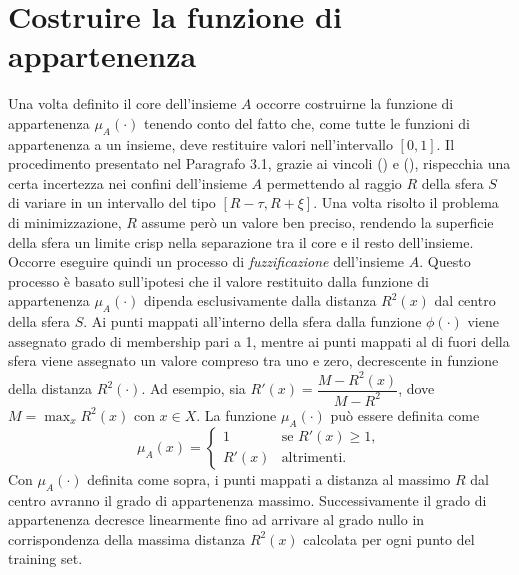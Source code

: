 \documentclass [11pt,a4paper,twoside,openright] {book}
\begin{document}
\section{Costruire la funzione di appartenenza}
Una volta definito il core dell'insieme $A$ occorre costruirne la funzione di appartenenza $\mu_A(\cdot)$ tenendo conto del fatto che, come tutte le funzioni di appartenenza a un insieme, deve restituire valori nell'intervallo $[0, 1]$. Il procedimento presentato nel Paragrafo 3.1, grazie ai vincoli () e (), rispecchia una certa incertezza nei confini dell'insieme $A$ permettendo al raggio $R$ della sfera $S$ di variare in un intervallo del tipo $[R - \tau , R + \xi]$. Una volta risolto il problema di minimizzazione, $R$ assume però un valore ben preciso, rendendo la superficie della sfera un limite crisp nella separazione tra il core e il resto dell'insieme. Occorre eseguire quindi un processo di \textit{fuzzificazione} dell'insieme $A$. Questo processo è basato sull'ipotesi che il valore restituito dalla funzione di appartenenza $\mu_A(\cdot)$ dipenda esclusivamente dalla distanza $R^2(x)$ dal centro della sfera $S$. Ai punti mappati all'interno della sfera dalla funzione $\phi(\cdot)$ viene assegnato grado di membership pari a 1, mentre ai punti mappati al di fuori della sfera viene assegnato un valore compreso tra uno e zero, decrescente in funzione della distanza $R^2(\cdot)$. Ad esempio, sia $R'(x) = \dfrac{M-R^2(x)}{M-R^2}$, dove $M= \max_x R^2(x)$ con $x \in X$. La funzione $\mu_A(\cdot)$ può essere definita come
\begin{equation}\label{fuzzyeq}
\mu_A(x)=
\begin{cases}
1 & \text{se } R'(x) \geq 1, \\
R'(x) & \text{altrimenti}.
\end{cases}
\end{equation}
Con $\mu_A(\cdot)$ definita come sopra, i punti mappati a distanza al massimo $R$ dal centro avranno il grado di appartenenza massimo. Successivamente il grado di appartenenza decresce linearmente fino ad arrivare al grado nullo in corrispondenza della massima distanza $R^2(x)$ calcolata per ogni punto del training set.
\end{document}
